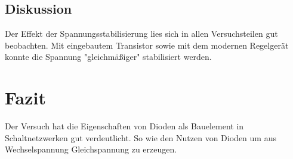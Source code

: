 \documentclass[12pt,a4paper]{article}
\begin{document}
\subsection{Diskussion}

Der Effekt der Spannungsstabilisierung lies sich in allen Versuchsteilen gut beobachten. Mit eingebautem Transistor sowie mit dem modernen Regelgerät konnte die Spannung "gleichmäßiger" stabilisiert werden.

\section{Fazit}

Der Versuch hat die Eigenschaften von Dioden als Bauelement in Schaltnetzwerken gut verdeutlicht. So wie den Nutzen von Dioden um aus Wechselspannung Gleichspannung zu erzeugen.
\end{document}
